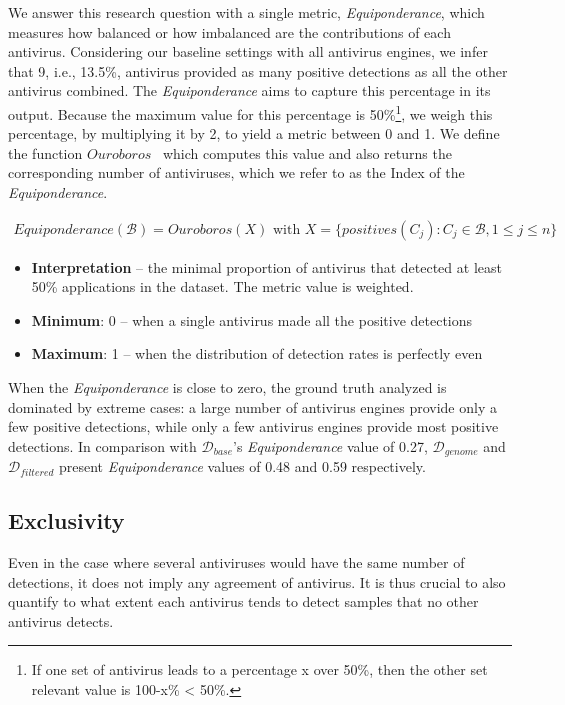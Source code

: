 We answer this research question with a single metric, \emph{Equiponderance}, which measures how balanced or how imbalanced are the contributions of each antivirus.
Considering our baseline settings with all antivirus engines, we infer that 9, i.e., 13.5\%, antivirus provided as many positive detections as all the other antivirus combined.
The {\em Equiponderance} aims to capture this percentage in its output.
Because the maximum value for this percentage is 50\%\footnote{If one set of antivirus leads to a percentage x over 50\%, then the other set relevant value is 100-x\% < 50\%.}, we weigh this percentage, by multiplying it by 2, to yield a metric between 0 and 1.
We define the function $Ouroboros$~\cite{hurier_definition_nodate} which computes this value and also returns the corresponding number of antiviruses, which we refer to as the Index of the {\em Equiponderance}.

\begin{mdframed}[hidealllines=true,nobreak=true]
\begin{gather*}
	Equiponderance(\mathcal{B}) = Ouroboros(X) \text{ with } X = \{positives(C_j) : C_j \in \mathcal{B}, 1 \leq j \leq n\}
\end{gather*}

\begin{itemize}
	\item{\textbf{Interpretation}} -- the minimal proportion of antivirus that detected at least 50\% applications in the dataset. The metric value is weighted.
	\item{\textbf{Minimum}:} 0 -- when a single antivirus made all the positive detections
	\item{\textbf{Maximum}:} 1 -- when the distribution of detection rates is perfectly even
\end{itemize}
\end{mdframed}

When the \emph{Equiponderance} is close to zero, the ground truth analyzed is dominated by extreme cases: a large number of antivirus engines provide only a few positive detections, while only a few antivirus engines provide most positive detections.
In comparison with $\mathcal{D}_{base}$'s {\em Equiponderance} value of 0.27, $\mathcal{D}_{genome}$ and $\mathcal{D}_{filtered}$ present \emph{Equiponderance} values of 0.48 and 0.59 respectively.
\subsection{Exclusivity}
Even in the case where several antiviruses would have the same number of detections, it does not imply any agreement of antivirus.
It is thus crucial to also quantify to what extent each antivirus tends to detect samples that no other antivirus detects.

